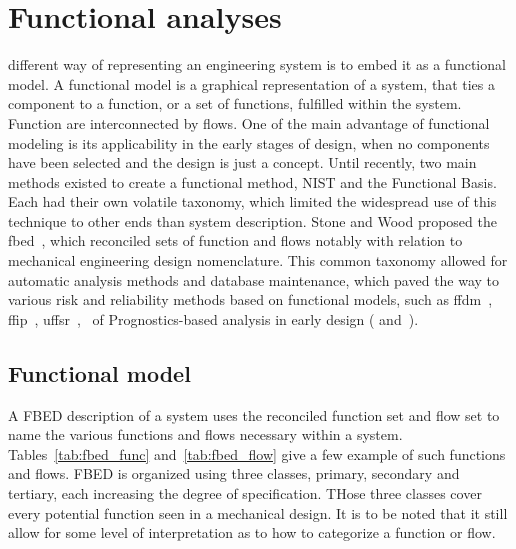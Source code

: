 %
%
\let\textcircled=\pgftextcircled
\chapter{Functional analyses}
\label{chap:fm}


 different way of representing an engineering system is to embed it as a functional model. A functional model is a graphical representation of a system, that ties a component to a function, or a set of functions, fulfilled within the system. Function are interconnected by flows. One of the main advantage of functional modeling is its applicability in the early stages of design, when no components have been selected and the design is just a concept. Until recently, two main methods existed to create a functional method, NIST and the Functional Basis. Each had their own volatile taxonomy, which limited the widespread use of this technique to other ends than system description. Stone and Wood proposed the \gls{fbed}~\cite{stone}, which reconciled sets of function and flows notably with relation to mechanical engineering design nomenclature. This common taxonomy allowed for automatic analysis methods and database maintenance, which paved the way to various risk and reliability methods based on functional models, such as \gls{ffdm}~\cite{stone2005}, \gls{ffip}~\cite{kurtoglu2007}, \gls{uffsr}~\cite{vanbossuyt2014},~\cite{ohalloran2015} of Prognostics-based analysis in early design (\cite{stack2015} and~\cite{lher2016}).


\section{Functional model}

A FBED description of a system uses the reconciled function set and flow set to name the various functions and flows necessary within a system. Tables~\ref{tab:fbed_func} and~\ref{tab:fbed_flow} give a few example of such functions and flows. FBED is organized using three classes, primary, secondary and tertiary, each increasing the degree of specification. THose three classes cover every potential function seen in a mechanical design. It is to be noted that it still allow for some level of interpretation as to how to categorize a function or flow.

